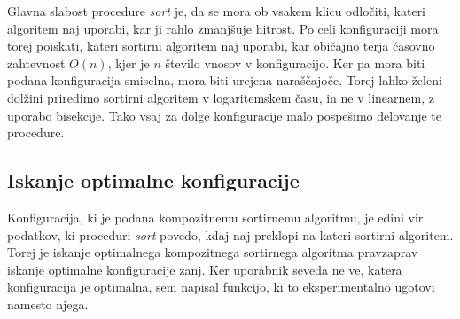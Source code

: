 \documentclass[a4paper,oneside]{article}
\begin{document}
Glavna slabost procedure \emph{sort} je, da se mora ob vsakem klicu odločiti, kateri
algoritem naj uporabi, kar ji rahlo zmanjšuje hitrost. Po celi konfiguraciji mora torej
poiskati, kateri sortirni algoritem naj uporabi, kar običajno terja časovno zahtevnost
$O(n)$, kjer je $n$ število vnosov v konfiguracijo. Ker pa mora biti podana konfiguracija
smiselna, mora biti urejena naraščajoče. Torej lahko želeni dolžini priredimo sortirni
algoritem v logaritemskem času, in ne v linearnem, z uporabo bisekcije. Tako vsaj za dolge
konfiguracije malo pospešimo delovanje te procedure.

\subsection{Iskanje optimalne konfiguracije}
\label{chapter:optimalconf}
Konfiguracija, ki je podana kompozitnemu sortirnemu algoritmu, je edini vir podatkov, ki
proceduri \emph{sort} povedo, kdaj naj preklopi na kateri sortirni algoritem.
Torej je iskanje optimalnega kompozitnega sortirnega algoritma pravzaprav iskanje optimalne
konfiguracije zanj. Ker uporabnik seveda ne ve, katera konfiguracija je optimalna, sem
napisal funkcijo, ki to eksperimentalno ugotovi namesto njega.
\end{document}
